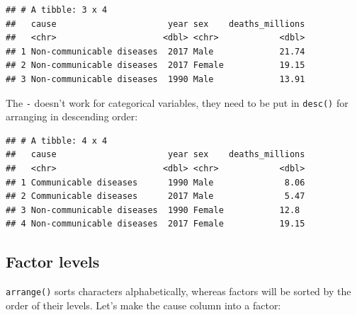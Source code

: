 \documentclass[
  12pt,
  krantz2]{krantz}
\makeatletter
\newenvironment{Shaded}{\begin{snugshade}}{\end{snugshade}}
\newcommand{\CommentTok}[1]{\textcolor[rgb]{0.56,0.35,0.01}{\textit{#1}}}
\newcommand{\DataTypeTok}[1]{\textcolor[rgb]{0.13,0.29,0.53}{#1}}
\newcommand{\DecValTok}[1]{\textcolor[rgb]{0.00,0.00,0.81}{#1}}
\newcommand{\KeywordTok}[1]{\textcolor[rgb]{0.13,0.29,0.53}{\textbf{#1}}}
\newcommand{\NormalTok}[1]{#1}
\newcommand{\OperatorTok}[1]{\textcolor[rgb]{0.81,0.36,0.00}{\textbf{#1}}}
\newcommand{\StringTok}[1]{\textcolor[rgb]{0.31,0.60,0.02}{#1}}
\newenvironment{kframe}{%
\medskip{}
\setlength{\fboxsep}{.8em}
 \def\at@end@of@kframe{}%
 \ifinner\ifhmode%
  \def\at@end@of@kframe{\end{minipage}}%
  \begin{minipage}{\columnwidth}%
 \fi\fi%
 \def\FrameCommand##1{\hskip\@totalleftmargin \hskip-\fboxsep
 \colorbox{shadecolor}{##1}\hskip-\fboxsep
     \hskip-\linewidth \hskip-\@totalleftmargin \hskip\columnwidth}%
 \MakeFramed {\advance\hsize-\width
   \@totalleftmargin\z@ \linewidth\hsize
   \@setminipage}}%
 {\par\unskip\endMakeFramed%
 \at@end@of@kframe}
\renewenvironment{Shaded}{\begin{kframe}}{\end{kframe}}
\makeatother
\begin{document}
\begin{verbatim}
## # A tibble: 3 x 4
##   cause                      year sex    deaths_millions
##   <chr>                     <dbl> <chr>            <dbl>
## 1 Non-communicable diseases  2017 Male             21.74
## 2 Non-communicable diseases  2017 Female           19.15
## 3 Non-communicable diseases  1990 Male             13.91
\end{verbatim}

The \texttt{-} doesn't work for categorical variables, they need to be put in \texttt{desc()} for arranging in descending order:

\begin{Shaded}
\end{Shaded}

\begin{verbatim}
## # A tibble: 4 x 4
##   cause                      year sex    deaths_millions
##   <chr>                     <dbl> <chr>            <dbl>
## 1 Communicable diseases      1990 Male              8.06
## 2 Communicable diseases      2017 Male              5.47
## 3 Non-communicable diseases  1990 Female           12.8 
## 4 Non-communicable diseases  2017 Female           19.15
\end{verbatim}

\hypertarget{factor-levels}{%
\subsection{Factor levels}\label{factor-levels}}


\texttt{arrange()} sorts characters alphabetically, whereas factors will be sorted by the order of their levels.
Let's make the cause column into a factor:

\begin{Shaded}
\end{Shaded}
\end{document}
